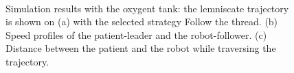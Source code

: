 \documentclass[journal]{IEEEtran}
\begin{document}
\begin{figure} 
    \centering
  \\
    \hspace*{-1.5em}
    \vspace*{-1.1em}
    \hspace*{-1.5em}
    \vspace*{1.1em}
  \caption{Simulation results with the oxygent tank: the lemniscate trajectory is shown on (a) with the selected strategy Follow the thread. (b) Speed profiles of the patient-leader and the robot-follower. (c) Distance between the patient and the robot while traversing the trajectory.}
  \label{fig:validationwithtank} 
\end{figure}
\end{document}
